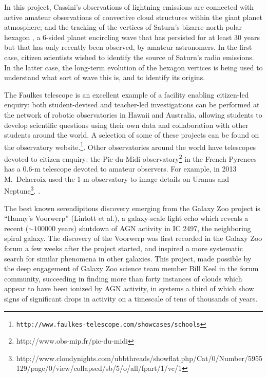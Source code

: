 \documentclass{ar2e}
\begin{document}
In this project, Cassini's observations of lightning emissions are connected
with active amateur observations of convective cloud structures within the giant
planet atmosphere; and the tracking of the vertices of Saturn's bizarre north
polar hexagon \citep{88godfrey}, a 6-sided planet encircling wave that has
persisted for at least 30 years but that has only recently been observed, by
amateur astronomers.  In the first case, citizen scientists wished to identify
the source of Saturn's radio emissions.  In the latter case, the long-term
evolution of the hexagon vertices is being used to understand what sort of wave
this is, and to identify its origins.

The Faulkes telescope is an excellent example of a facility enabling  citizen-led
enquiry: both student-devised and teacher-led investigations can be performed at
the network of robotic observatories in Hawaii and Australia, allowing students
to develop scientific questions using their own data and collaboration with
other students around the world.  A selection of some of these projects can be
found on the observatory
website.\footnote{\texttt{http://www.faulkes-telescope.com/showcases/schools}}. 
Other observatories around the world have telescopes devoted to citizen enquiry:
the Pic-du-Midi observatory\footnote{http://www.obs-mip.fr/pic-du-midi} in the
French Pyrenees has a 0.6-m telescope devoted to amateur observers.   For
example, in 2013 M.~Delacroix used the 1-m observatory to image details on
Uranus and
Neptune\footnote{http://www.cloudynights.com/ubbthreads/showflat.php/Cat/0/Number/5955129/page/0/view/collapsed/sb/5/o/all/fpart/1/vc/1}.
.



 The best known serendipitous discovery
emerging from the Galaxy Zoo project is ``Hanny's Voorwerp'' (Lintott et al.), a
galaxy-scale light echo which reveals a recent ($\sim 100000$ years) shutdown of
AGN activity in IC 2497, the neighboring spiral galaxy. The discovery of the
Voorwerp was first recorded in the Galaxy Zoo forum a few weeks after the
project started, and inspired a more systematic search for similar phenomena in
other galaxies. This project, made possible by the deep engagement of Galaxy Zoo
science team member Bill Keel in the forum community, succeeding in finding more
than forty instances of clouds which appear to have been ionized by AGN
activity, in systems a third of which show signs of significant drops in
activity on a timescale of tens of thousands of years. 
\end{document}

